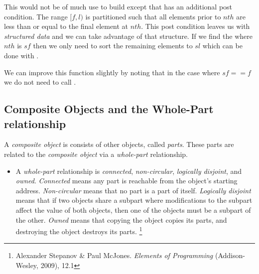 This would not be of much use to build
except that  has an additional post condition. The range $[f, l)$ is partitioned such that all elements prior to $nth$ are less than or equal to the final element at $nth$. This post condition leaves us with \textit{structured data} and we can take advantage of that structure. If we find the  where $nth$ is $sf$ then we only need to sort the remaining elements to $sl$ which can be done with .


\begin{minipage}{\linewidth}
	
\end{minipage}  
  
  

We can improve this function slightly by noting that in the case where $sf == f$ we do not need to call .

\begin{minipage}{\linewidth}
	
\end{minipage}


\subsection{Composite Objects and the Whole-Part relationship}

A \textit{composite object} is consists of other objects, called \textit{parts}. These parts are related to the \textit{composite object} via a \textit{whole-part} relationship.

\begin{itemize}
\item A \textit{whole-part} relationship is \textit{connected}, \textit{non-circular}, \textit{logically disjoint}, and \textit{owned}. \textit{Connected} means any part is reachable from the object's starting address. \textit{Non-circular} means that no part is a part of itself. \textit{Logically disjoint} means that if two objects share a subpart where modifications to the subpart affect the value of both objects, then one of the objects must be a subpart of the other. \textit{Owned} means that copying the object copies its parts, and destroying the object destroys its parts. \footnote{Alexander Stepanov \& Paul McJones. \textit{Elements of Programming} (Addison-Wesley, 2009), 12.1}
\end{itemize}
